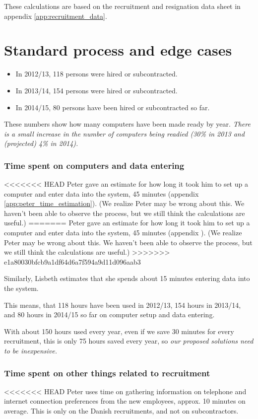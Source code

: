 \label{app:cost_benefit_analysis}
These calculations are based on the recruitment and resignation data sheet in appendix \ref{app:recruitment_data}.

\section{Standard process and edge cases}
\begin{itemize}
\item In 2012/13, 118 persons were hired or subcontracted.
\item In 2013/14, 154 persons were hired or subcontracted.
\item In 2014/15, 80 persons have been hired or subcontracted so far.
\end{itemize}
These numbers show how many computers have been made ready by year.
\emph{There is a small increase in the number of computers being readied (30\% in 2013 and (projected) 4\% in 2014).}

\subsubsection{Time spent on computers and data entering}
<<<<<<< HEAD
Peter gave an estimate for how long it took him to set up a computer and enter data into the system, 45 minutes (appendix \ref{app:peter_time_estimation}). (We realize Peter may be wrong about this. We haven't been able to observe the process, but we still think the calculations are useful.)
=======
Peter gave an estimate for how long it took him to set up a computer and enter data into the system, 45 minutes (appendix ). (We realize Peter may be wrong about this. We haven't been able to observe the process, but we still think the calculations are useful.)
>>>>>>> e1a80030bfcb9a1df64d6a7f594a9d11d096aab3

Similarly, Lisbeth estimates that she spends about 15 minutes entering data into the system.

This means, that 118 hours have been used in 2012/13, 154 hours in 2013/14, and 80 hours in 2014/15 so far on computer setup and data entering.

With about 150 hours used every year, even if we save 30 minutes for every recruitment, this is only 75 hours saved every year, so \emph{our proposed solutions need to be inexpensive.}

\subsubsection{Time spent on other things related to recruitment}
<<<<<<< HEAD
Peter uses time on gathering information on telephone and internet connection preferences from the new employees, approx. 10 minutes on average.
This is only on the Danish recruitments, and not on subcontractors.

